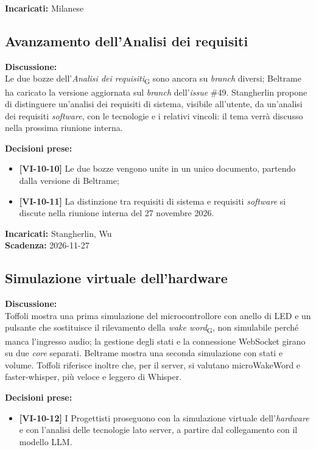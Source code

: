 \documentclass[12pt,a4paper]{article}
\newcommand{\vnum}{10}                     %
\newcommand{\gl}[1]{\emph{#1}\textsubscript{\scriptsize G}}       %
\newcommand{\tightlist}{\setlength{\itemsep}{1pt}\setlength{\parskip}{0pt}}
\begin{document}
\textbf{Incaricati:} Milanese

\hypertarget{odg-4}{%
\subsection{Avanzamento dell'Analisi dei requisiti}}

\textbf{Discussione:}\\
Le due bozze dell'\gl{Analisi dei requisiti} sono ancora su \emph{branch} diversi; Beltrame ha caricato la versione aggiornata sul \emph{branch} dell'\emph{issue} \#49. Stangherlin propone di distinguere un'analisi dei requisiti di sistema, visibile all'utente, da un'analisi dei requisiti \emph{software}, con le tecnologie e i relativi vincoli: il tema verrà discusso nella prossima riunione interna.

\textbf{Decisioni prese:}
\begin{itemize}
\tightlist
\item[$\checkmark$] \textbf{[VI-\vnum-10]} Le due bozze vengono unite in un unico documento, partendo dalla versione di Beltrame;
\item[$\checkmark$] \textbf{[VI-\vnum-11]} La distinzione tra requisiti di sistema e requisiti \emph{software} si discute nella riunione interna del 27 novembre 2026.
\end{itemize}

\textbf{Incaricati:} Stangherlin, Wu\\
\textbf{Scadenza:} 2026-11-27

\hypertarget{odg-5}{%
\subsection{Simulazione virtuale dell'hardware}}

\textbf{Discussione:}\\
Toffoli mostra una prima simulazione del microcontrollore con anello di LED e un pulsante che sostituisce il rilevamento della \gl{wake word}, non simulabile perché manca l'ingresso audio; la gestione degli stati e la connessione WebSocket girano su due \emph{core} separati. Beltrame mostra una seconda simulazione con stati e volume. Toffoli riferisce inoltre che, per il server, si valutano microWakeWord e faster-whisper, più veloce e leggero di Whisper.

\textbf{Decisioni prese:}
\begin{itemize}
\tightlist
\item[$\checkmark$] \textbf{[VI-\vnum-12]} I Progettisti proseguono con la simulazione virtuale dell'\emph{hardware} e con l'analisi delle tecnologie lato server, a partire dal collegamento con il modello LLM.
\end{itemize}
\end{document}
